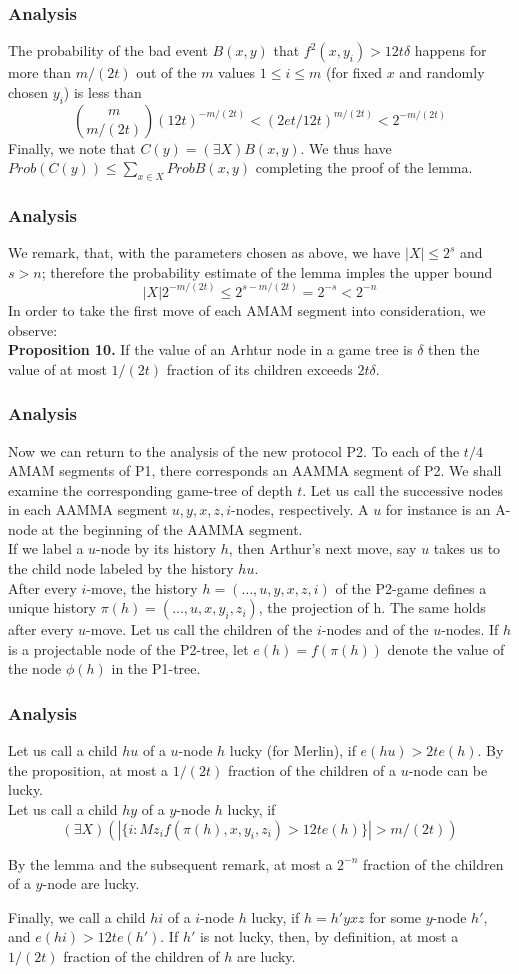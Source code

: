 \documentclass{beamer}
\begin{document}
\begin{frame}
\frametitle{Analysis}
The probability of the bad event $B(x, y)$ that $f^2(x, y_i) > 12t\delta$ happens for more than $m/(2t)$ out of the $m$ values $1 \leq i \leq m$ (for fixed $x$ and randomly chosen $y_i$) is less than $$\binom{m}{m/(2t)} (12t)^{-m/(2t)} < (2et/12t)^{m/(2t)} < 2 ^{-m/(2t)}$$
Finally, we note that $C(y) = (\exists X) B (x, y)$. We thus have $Prob(C(y)) \leq \sum _{x \in X} Prob B(x, y)$ completing the proof of the lemma.\\
\end{frame}

\begin{frame}
\frametitle{Analysis}
We remark, that, with the parameters chosen as above, we have $|X| \leq 2^s$ and $s > n$; therefore the probability estimate of the lemma imples the upper bound 
$$|X| 2^{-m/(2t)} \leq 2^{s - m/(2t)} = 2^{-s} < 2^{-n}$$
In order to take the first move of each AMAM segment into consideration, we observe:\\
\textbf{Proposition 10.} If the value of an Arhtur node in a game tree is $\delta$ then the value of at most $1/(2t)$ fraction of its children exceeds $2t\delta$.
\end{frame}

\begin{frame}
\frametitle{Analysis}
Now we can return to the analysis of the new protocol P2. To each of the $t/4$ AMAM segments of P1, there corresponds an AAMMA segment of P2. We shall examine the corresponding game-tree of depth $t$. Let us call the successive nodes in each AAMMA segment $u, y, x, z, i$-nodes, respectively. A $u$ for instance is an A-node at the beginning of the AAMMA segment.\\
If we label a $u$-node by its history $h$, then Arthur's next move, say $u$ takes us to the child node labeled by the history $hu$.\\
After every $i$-move, the history $h = (\dots, u, y, x, z, i)$ of the P2-game defines a unique history $\pi(h) = (\ldots, u, x, y_i, z_i)$, the projection of h. The same holds after every $u$-move. Let us call the children of the $i$-nodes and of the $u$-nodes. If $h$ is a projectable node of the P2-tree, let $e(h) = f(\pi(h))$ denote the value of the node $\phi(h)$ in the P1-tree.
\end{frame}

\begin{frame}
\frametitle{Analysis}
Let us call a child $hu$ of a $u$-node $h$ lucky (for Merlin), if $e(hu) > 2te(h)$. By the proposition, at most a $1/(2t)$ fraction of the children of a $u$-node can be lucky.\\
Let us call a child $hy$ of a $y$-node $h$ lucky, if 
$$(\exists X)(|\{i : Mz_i f(\pi(h), x, y_i, z_i)> 12te(h)\}| > m/(2t))$$

By the lemma and the subsequent remark, at most a $2^{-n}$ fraction of the children of a $y$-node are lucky.

Finally, we call a child $hi$ of a $i$-node $h$ lucky, if $h = h'yxz$ for some $y$-node $h'$, and $e(hi) > 12te(h')$. If $h'$ is not lucky, then, by definition, at most a $1/(2t)$ fraction of the children of $h$ are lucky.
\end{frame}
\end{document}
